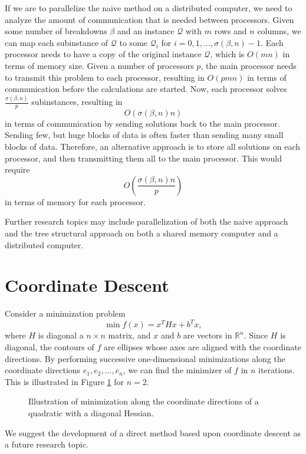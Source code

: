 \documentclass[a4paper,12pt]{report}
\begin{document}
If we are to parallelize the naive method on a distributed computer, we need to
analyze the amount of communication that is needed between processors.
Given some number of breakdowns $\beta$ and an instance $\mathcal{Q}$ with
$m$ rows and $n$ columns, we can map each subinstance of $\mathcal{Q}$ to some
$\mathcal{Q}_i$ for $i=0,1,\ldots,\sigma(\beta,n) - 1$. Each processor needs to
have a copy of the original instance $\mathcal{Q}$, which is $O(mn)$ in terms
of memory size. Given a number of processors $p$, the main processor needs to
transmit this problem to each processor, resulting in $O(pmn)$ in terms of
communication before the calculations are started. Now, each
processor solves $\frac{\sigma(\beta, n)}{p}$ subinstances, resulting in
\[
O(\sigma(\beta, n)n)
\]
in terms of communication by sending solutions back to the main processor.
Sending few, but huge blocks of data is often faster than sending many small
blocks of data.
Therefore, an alternative approach is to store all solutions on each processor,
and then transmitting them all to the main processor.
This would require
\[
O\left(\frac{\sigma(\beta, n)n}{p}\right)
\]
in terms of memory for each processor.

Further research topics may include parallelization of both the naive approach
and the tree structural approach on both a shared memory computer and a
distributed computer.

\section{Coordinate Descent}
Consider a minimization problem
\[
    \min f(x) = x^T H x + b^T x,
\]
where $H$ is diagonal a $n \times n$ matrix, and $x$ and $b$ are vectors in
$\mathbb{R}^n$.
Since $H$ is diagonal, the contours of $f$ are ellipses
whose axes are aligned with the coordinate directions\cite{nocedal}.
By performing successive one-dimensional minimizations along the
coordinate directions $e_1,e_2,\ldots,e_n$, we can find the minimizer of $f$
in $n$ iterations. This is illustrated in Figure \ref{fig:coordinatedescent}
for $n = 2$.

\begin{figure}[ht!]
\centering

\caption{Illustration of minimization along the coordinate directions of a
         quadratic with a diagonal Hessian.}
\label{fig:coordinatedescent}
\end{figure}

We suggest the development of a direct method based upon coordinate
descent as a future research topic.


{}


\onecolumn

\end{document}
